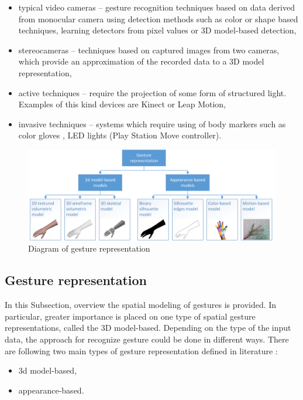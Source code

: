 \begin{itemize}

\item typical video cameras -- gesture recognition techniques based on data derived from monocular camera using detection methods such as color or shape based techniques, learning detectors from pixel values or 3D model-based detection,

\item stereocameras -- techniques based on captured images from two cameras, which provide an approximation of the recorded data to a 3D model representation,

\item active techniques -- require the projection of some form of structured light. Examples of this kind devices are Kinect or Leap Motion,

\item invasive techniques -- systems which require using of body markers such as color gloves \cite{Wang:2009:RHC:1531326.1531369}, LED lights (Play Station Move controller).

\end{itemize}

\begin{figure}[htb]
\centering
 \includegraphics[width=1\columnwidth]{figures/gestureRepresentations.png}
 \caption[]{Diagram of gesture representation}
 \label{gesturerepresentations}
\end{figure}

\subsection{Gesture representation}
In this Subsection, overview the spatial modeling of gestures is provided. In particular, greater importance is placed on one type of spatial gesture representations, called the 3D model-based. Depending on the type of the input data, the approach for recognize gesture could be done in different ways.
There are following two main types of gesture representation defined in literature \cite{Huang95handgesture}\cite{Pavlovic97visualinterpretation}:
\begin{itemize}
\item 3d model-based,
\item appearance-based.
\end{itemize}

